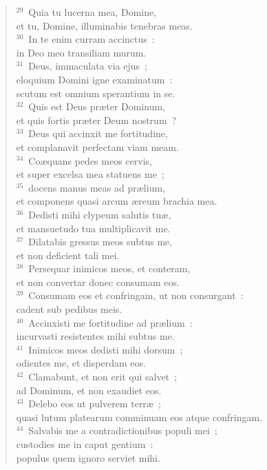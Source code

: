 \begin{flushleft}
\begin{verse}
${}^{29}$~Quia tu lucerna mea, Domine,\\ et tu, Domine, illuminabis tenebras meas.\\
${}^{30}$~In te enim curram accinctus~:\\ in Deo meo transiliam murum.\\
${}^{31}$~Deus, immaculata via ejus~;\\ eloquium Domini igne examinatum~:\\ scutum est omnium sperantium in se.\\
${}^{32}$~Quis est Deus pr\ae ter Dominum,\\ et quis fortis pr\ae ter Deum nostrum~?\\
${}^{33}$~Deus qui accinxit me fortitudine,\\ et complanavit perfectam viam meam.\\
${}^{34}$~Co\ae quans pedes meos cervis,\\ et super excelsa mea statuens me~;\\
${}^{35}$~docens manus meas ad pr\ae lium,\\ et componens quasi arcum \ae reum brachia mea.\\
${}^{36}$~Dedisti mihi clypeum salutis tu\ae ,\\ et mansuetudo tua multiplicavit me.\\
${}^{37}$~Dilatabis gressus meos subtus me,\\ et non deficient tali mei.\\
${}^{38}$~Persequar inimicos meos, et conteram,\\ et non convertar donec consumam eos.\\
${}^{39}$~Consumam eos et confringam, ut non consurgant~:\\ cadent sub pedibus meis.\\
${}^{40}$~Accinxisti me fortitudine ad pr\ae lium~:\\ incurvasti resistentes mihi subtus me.\\
${}^{41}$~Inimicos meos dedisti mihi dorsum~;\\ odientes me, et disperdam eos.\\
${}^{42}$~Clamabunt, et non erit qui salvet~;\\ ad Dominum, et non exaudiet eos.\\
${}^{43}$~Delebo eos ut pulverem terr\ae~;\\ quasi lutum platearum comminuam eos atque confringam.\\
${}^{44}$~Salvabis me a contradictionibus populi mei~;\\ custodies me in caput gentium~:\\ populus quem ignoro serviet mihi.\\

\end{verse}
\end{flushleft}
